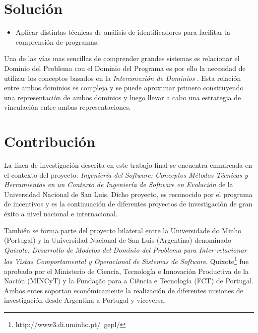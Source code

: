 \documentclass[12pt]{report}
\begin{document}
\section{Solución}

\begin{itemize}
\item Aplicar distintas técnicas de análisis de identificadores para facilitar la comprensión de programas.
\end{itemize}

Una de las vías mas sencillas de comprender grandes sistemas es relacionar el Dominio del Problema con el Dominio del Programa es por ello la necesidad de utilizar los conceptos basados en la \textit{Interconexión de Dominios} \cite{BRM10}.
Esta relación entre ambos dominios es compleja y se puede aproximar primero construyendo una representación de ambos dominios y luego llevar a cabo una estrategia de vinculación entre ambas representaciones.

\pagebreak %
\section{Contribución}
La línea de investigación descrita en este trabajo final se encuentra enmarcada en el 
contexto del proyecto: \textit{Ingeniería del Software: Conceptos Métodos Técnicas y 
Herramientas en un Contexto de Ingeniería de Software en Evolución} de la Universidad 
Nacional de San Luis. 
Dicho proyecto, es reconocido por el programa de incentivos y es la continuación de 
diferentes proyectos de investigación de gran éxito a nivel nacional e internacional.

También se forma parte del proyecto bilateral entre la Universidade do Minho (Portugal)
 y la Universidad Nacional de San Luis (Argentina) denominado \textit{Quixote: Desarrollo de 
Modelos del Dominio del Problema para Inter-relacionar las Vistas Comportamental y 
Operacional de Sistemas de Software}. Quixote\footnote[1]{http://www3.di.uminho.pt/~gepl/} fue aprobado por el 
Ministerio de Ciencia, Tecnología e Innovación Productiva de la Nación 
(MINCyT) y la Fundação para a Ciência e Tecnología (FCT) de Portugal. 
Ambos entes soportan económicamente la realización de diferentes misiones de investigación desde Argentina a Portugal y viceversa.
\end{document}

